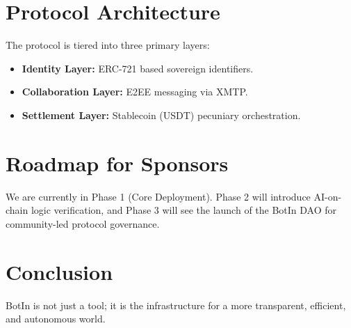 \documentclass[11pt,a4paper]{article}
\begin{document}
\section{Protocol Architecture}
The protocol is tiered into three primary layers:
\begin{itemize}
    \item \textbf{Identity Layer:} ERC-721 based sovereign identifiers.
    \item \textbf{Collaboration Layer:} E2EE messaging via XMTP.
    \item \textbf{Settlement Layer:} Stablecoin (USDT) pecuniary orchestration.
\end{itemize}

\section{Roadmap for Sponsors}
We are currently in Phase 1 (Core Deployment). Phase 2 will introduce AI-on-chain logic verification, and Phase 3 will see the launch of the BotIn DAO for community-led protocol governance.

\section{Conclusion}
BotIn is not just a tool; it is the infrastructure for a more transparent, efficient, and autonomous world.
\end{document}
